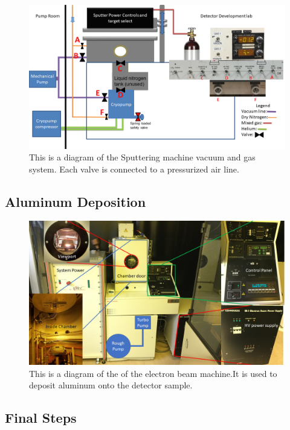 \begin{figure}
\includegraphics[width=\textwidth]{figures/sput-flow}
\caption{This is a diagram of the Sputtering machine vacuum and gas system. Each valve is connected to a pressurized air line.}
\label{LandscapeFigure}
\end{figure}

\subsection{Aluminum Deposition}

\begin{figure}
\includegraphics[width=\textwidth]{figures/ebeam-flow}
\caption{This is a diagram of the of the electron beam machine.It is used to deposit aluminum onto the detector sample.}
\label{LandscapeFigure}
\end{figure}


\subsection{Final Steps}
